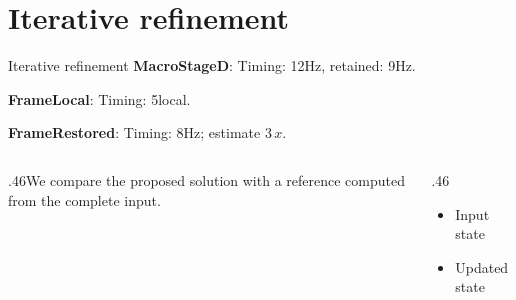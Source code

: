 \documentclass[9pt,aspectratio=169]{beamer}
\newcommand{\fuzzlayerA}[1]{\textbf{#1}}
\newcommand{\fuzzterm}[1]{\fuzzlayerA{#1}}
\newcommand{\fuzzpair}[2]{\fuzzterm{#1}: #2}
\newcommand{\fuzzunit}{Hz}
\let\fuzzoriginalunit\fuzzunit
\newcommand{\fuzzcoefficient}{3}
\newcommand{\fuzzscale}[2][\fuzzcoefficient]{#1\,#2}
\begin{document}
\section{Iterative refinement}
\begin{frame}[t]{Iterative refinement}
\fuzzpair{MacroStageD}{Timing: 12\fuzzunit, retained: 9\fuzzoriginalunit.}\par
{\renewcommand{\fuzzunit}{local}\fuzzpair{FrameLocal}{Timing: 5\fuzzunit.}\par}
\fuzzpair{FrameRestored}{Timing: 8\fuzzunit; estimate $\fuzzscale{x}$.}\par
\begin{columns}[T]\begin{column}{.46\textwidth}We compare the proposed solution with a reference computed from the complete input.\end{column}\begin{column}{.46\textwidth}\begin{itemize}\item Input state\item Updated state\end{itemize}\end{column}\end{columns}
\end{frame}
\end{document}
